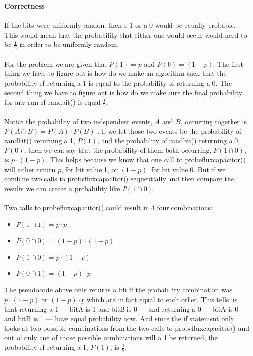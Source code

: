\documentclass[12pt]{article}
\begin{document}
\begin{enumerate}
\begin{enumerate}
			\textbf{Correctness}\\
			\\
			If the bits were uniformly random then a $1$ or a $0$ would be equally probable.  
			This would mean that the probability that either one would occur would need to be $\frac{1}{2}$ in order to be uniformly random.\\
			\\
			For the problem we are given that $P(1) = p$ and $P(0) = (1-p)$.  
			The first thing we have to figure out is how do we make an algorithm such that the probability of returning a 1 is equal 
			to the probability of returning a 0.  The second thing we have to figure out is how do we make sure the final probability for any run of randbit() is equal $\frac{1}{2}$.\\
			\\
			Notice the probability of two independent events, $A$ and $B$, occurring together is $P(A \cap B) = P(A) \cdot P(B)$ \cite{1}.
			If we let those two events be the probability of randbit() returning a 1, $P(1)$, and the probability of randbit() returning a 0, $P(0)$, 
			then we can say that the probability of them both occurring, $P(1 \cap 0)$, is $p \cdot (1-p)$.  
			This helps because we know that one call to probefluxcapacitor() will either return $p$, for bit value 1, or $(1-p)$, for bit value 0.  
			But if we combine two calls to probefluxcapacitor() sequentially and then compare the results we can create a probability like $P(1 \cap 0)$.\\
			\\
			Two calls to probefluxcapacitor() could result in 4 four combinations:
			\begin{itemize}
				\item $P(1 \cap 1) = p \cdot p$\\
				\item $P(0 \cap 0) = (1-p) \cdot (1-p)$\\
				\item $P(1 \cap 0) = p \cdot (1-p)$\\
				\item $P(0 \cap 1) = (1-p) \cdot p$\\
			\end{itemize}
			The pseudocode above only returns a bit if the probability combination was $p \cdot (1-p)$ or $(1-p) \cdot p$ which are in fact equal to each other.
			This tells us that returning a 1 --- bitA is 1 and bitB is 0 --- and returning a 0 --- bitA is 0 and bitB is 1 --- have equal probability now.  
			And since the if statement only looks at two possible combinations from the two calls to probefluxcapacitor() 
			and out of only one of those possible combinations will a 1 be returned, the probability of returning a 1, $P(1)$, is $\frac{1}{2}$.\\


\end{enumerate}
\end{enumerate}
\end{document}
